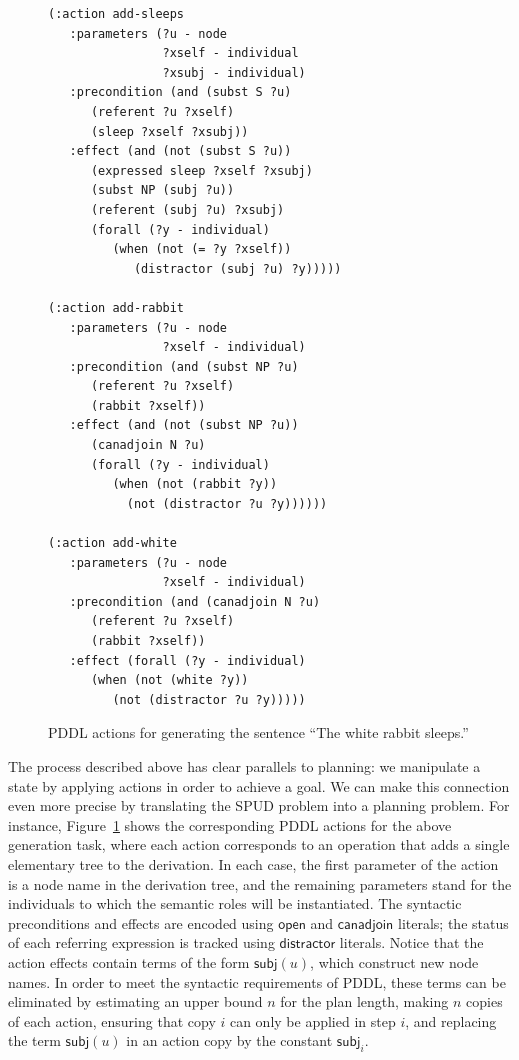 \begin{figure}[t]
\centering
{\small%
\begin{verbatim}
(:action add-sleeps
   :parameters (?u - node
                ?xself - individual
                ?xsubj - individual)
   :precondition (and (subst S ?u)
      (referent ?u ?xself)
      (sleep ?xself ?xsubj))
   :effect (and (not (subst S ?u))
      (expressed sleep ?xself ?xsubj)
      (subst NP (subj ?u))
      (referent (subj ?u) ?xsubj)
      (forall (?y - individual)
         (when (not (= ?y ?xself))
            (distractor (subj ?u) ?y)))))

(:action add-rabbit
   :parameters (?u - node
                ?xself - individual)
   :precondition (and (subst NP ?u)
      (referent ?u ?xself)
      (rabbit ?xself))
   :effect (and (not (subst NP ?u))
      (canadjoin N ?u)
      (forall (?y - individual)
         (when (not (rabbit ?y))
           (not (distractor ?u ?y))))))

(:action add-white
   :parameters (?u - node
                ?xself - individual)
   :precondition (and (canadjoin N ?u)
      (referent ?u ?xself)
      (rabbit ?xself))
   :effect (forall (?y - individual)
      (when (not (white ?y))
         (not (distractor ?u ?y)))))
\end{verbatim}}%
\caption{PDDL actions for generating the sentence ``The white rabbit
sleeps.''}
\label{fig:white-rabbit-as-planning}
\end{figure}


The process described above has clear parallels to planning: we manipulate
a state by applying actions in order to achieve a goal. We can make this
connection even more precise by translating the SPUD problem into a
planning problem. For instance, Figure~\ref{fig:white-rabbit-as-planning}
shows the corresponding PDDL actions for the above generation task, where
each action corresponds to an operation that adds a single elementary tree
to the derivation.  In each case, the first parameter of the action is a
node name in the derivation tree, and the remaining parameters stand for
the individuals to which the semantic roles will be instantiated.  The
syntactic preconditions and effects are encoded using $\mathsf{open}$ and
$\mathsf{canadjoin}$ literals; the status of each referring expression is
tracked using $\mathsf{distractor}$ literals. Notice that the action
effects contain terms of the form $\mathsf{subj}(u)$, which construct new
node names. In order to meet the syntactic requirements of PDDL, these
terms can be eliminated by estimating an upper bound $n$ for the plan
length, making $n$ copies of each action, ensuring that copy $i$ can only
be applied in step $i$, and replacing the term $\mathsf{subj}(u)$ in an
action copy by the constant $\mathsf{subj}_i$.

